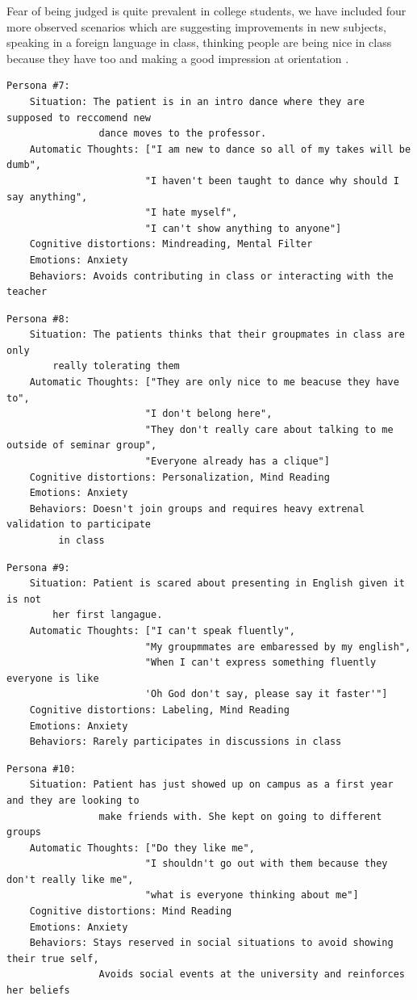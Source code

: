 \documentclass[twoside]{report}
\begin{document}
Fear of being judged is quite prevalent in college students, we have included four more observed scenarios which are suggesting improvements in new subjects, speaking in a foreign language in class, thinking people are being nice in class because they have too and making a good impression at orientation \cite{lee2022socially}.

\begin{verbatim}
Persona #7:
    Situation: The patient is in an intro dance where they are supposed to reccomend new 
                dance moves to the professor.
    Automatic Thoughts: ["I am new to dance so all of my takes will be dumb",
                        "I haven't been taught to dance why should I say anything",
                        "I hate myself",
                        "I can't show anything to anyone"]
    Cognitive distortions: Mindreading, Mental Filter
    Emotions: Anxiety
    Behaviors: Avoids contributing in class or interacting with the teacher
\end{verbatim}
\begin{verbatim}
Persona #8:
    Situation: The patients thinks that their groupmates in class are only 
    	really tolerating them
    Automatic Thoughts: ["They are only nice to me beacuse they have to",
                        "I don't belong here",
                        "They don't really care about talking to me outside of seminar group",
                        "Everyone already has a clique"]
    Cognitive distortions: Personalization, Mind Reading
    Emotions: Anxiety
    Behaviors: Doesn't join groups and requires heavy extrenal validation to participate
    	 in class
\end{verbatim}
\begin{verbatim}
Persona #9:
    Situation: Patient is scared about presenting in English given it is not 
    	her first langague.
    Automatic Thoughts: ["I can't speak fluently",
                        "My groupmmates are embaressed by my english",
                        "When I can't express something fluently everyone is like
                        'Oh God don't say, please say it faster'"]
    Cognitive distortions: Labeling, Mind Reading
    Emotions: Anxiety
    Behaviors: Rarely participates in discussions in class
\end{verbatim}
\begin{verbatim}
Persona #10:
    Situation: Patient has just showed up on campus as a first year and they are looking to 
                make friends with. She kept on going to different groups
    Automatic Thoughts: ["Do they like me",
                        "I shouldn't go out with them because they don't really like me",
                        "what is everyone thinking about me"]
    Cognitive distortions: Mind Reading
    Emotions: Anxiety
    Behaviors: Stays reserved in social situations to avoid showing their true self, 
                Avoids social events at the university and reinforces her beliefs
\end{verbatim}
\end{document}
